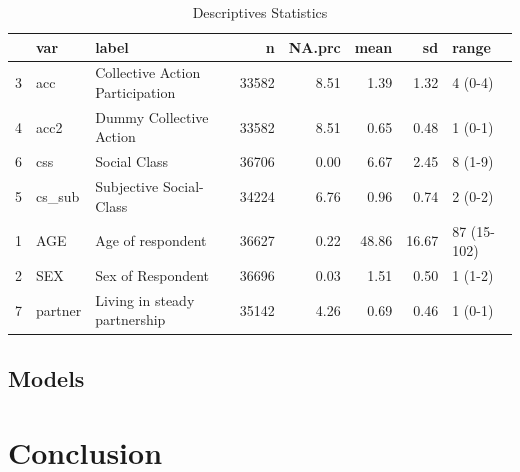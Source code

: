 \documentclass[12pt]{article}
\begin{document}
\begin{table}[ht]
\centering
\caption{Descriptives Statistics}
\begin{tabular}{rllrrrrl}
  \hline
 & var & label & n & NA.prc & mean & sd & range \\ 
  \hline
3 & acc & Collective Action Participation & 33582 & 8.51 & 1.39 & 1.32 & 4 (0-4) \\ 
  4 & acc2 & Dummy Collective Action & 33582 & 8.51 & 0.65 & 0.48 & 1 (0-1) \\ 
  6 & css & Social Class & 36706 & 0.00 & 6.67 & 2.45 & 8 (1-9) \\ 
  5 & cs\_sub & Subjective Social-Class & 34224 & 6.76 & 0.96 & 0.74 & 2 (0-2) \\ 
  1 & AGE & Age of respondent & 36627 & 0.22 & 48.86 & 16.67 & 87 (15-102) \\ 
  2 & SEX & Sex of Respondent & 36696 & 0.03 & 1.51 & 0.50 & 1 (1-2) \\ 
  7 & partner & Living in steady partnership & 35142 & 4.26 & 0.69 & 0.46 & 1 (0-1) \\ 
   \hline
\end{tabular}
\end{table}

\hypertarget{models}{%
\subsection{Models}\label{models}}

\hypertarget{conc}{%
\section{Conclusion}\label{conc}}


\renewcommand\refname{References}

\end{document}
